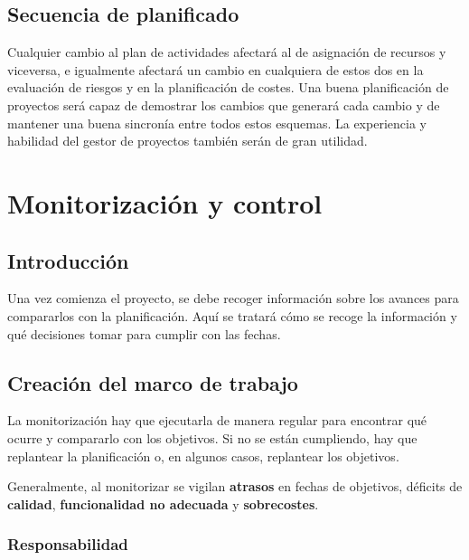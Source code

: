 \documentclass[12pt]{article}
\begin{document}
\subsection{Secuencia de planificado}
\label{8.10.0}

{Cualquier cambio al plan de actividades afectará al de asignación de recursos y viceversa, e igualmente afectará un cambio en cualquiera de estos dos en la evaluación de riesgos y en la planificación de costes. Una buena planificación de proyectos será capaz de demostrar los cambios que generará cada cambio y de mantener una buena sincronía entre todos estos esquemas. La experiencia y habilidad del gestor de proyectos también serán de gran utilidad.}

\newpage
\section{Monitorización y control}
\label{9.0.0}

\subsection{Introducción}
\label{9.1.0}

{Una vez comienza el proyecto, se debe recoger información sobre los avances para compararlos con la planificación. Aquí se tratará cómo se recoge la información y qué decisiones tomar para cumplir con las fechas.}

\subsection{Creación del marco de trabajo}
\label{9.2.0}

{La monitorización hay que ejecutarla de manera regular para encontrar qué ocurre y compararlo con los objetivos. Si no se están cumpliendo, hay que replantear la planificación o, en algunos casos, replantear los objetivos.} \bigskip

{Generalmente, al monitorizar se vigilan \textbf{atrasos} en fechas de objetivos, déficits de \textbf{calidad}, \textbf{funcionalidad no adecuada} y \textbf{sobrecostes}.}

\subsubsection{Responsabilidad}
\label{9.2.1}
\end{document}
